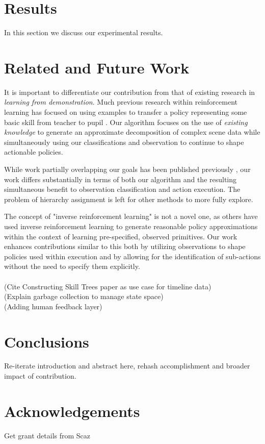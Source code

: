 \documentclass[letterpaper]{article}
\begin{document}
\section{Results}
\label{sec:result}
In this section we discuss our experimental results.

\section{Related and Future Work}
\label{sec:future}
It is important to differentiate our contribution from that of
existing research in \textit{learning from demonstration}.  Much previous research within reinforcement learning has focused on using examples to
transfer a policy representing some basic skill from teacher to
pupil \cite{JenkinsLFD,LFDSurvey}.  Our algorithm focuses on the use of
\textit{existing knowledge} to generate an approximate decomposition of
complex scene data while simultaneously using our classifications and observation to continue to shape actionable policies.


While work partially overlapping our goals has been published previously \cite{LearningBehaviorFusion}, 
our work differs substantially in terms of both our algorithm and the resulting simultaneous benefit to
observation classification and action execution. The problem of hierarchy assignment is left for other
methods to more fully explore.

The concept of "inverse reinforcement learning" is not a novel one, 
as others \cite{InverseRL} have used inverse reinforcement learning
to generate reasonable policy approximations within the context of learning 
pre-specified, observed primitives. Our work enhances contributions similar to this both by utilizing
observations to shape policies used within execution and by allowing for the identification of sub-actions
without the need to specify them explicitly.\\ 
\\
	(Cite Constructing Skill Trees paper as use case for timeline data)\\
	(Explain garbage collection to manage state space)\\
	(Adding human feedback layer)\\

\section{Conclusions}
Re-iterate introduction and abstract here, rehash accomplishment and broader impact of contribution.

\label{sec:conclusions}


\section{Acknowledgements}
\label{sec:acknowledgements}
Get grant details from Scaz



\end{document}
